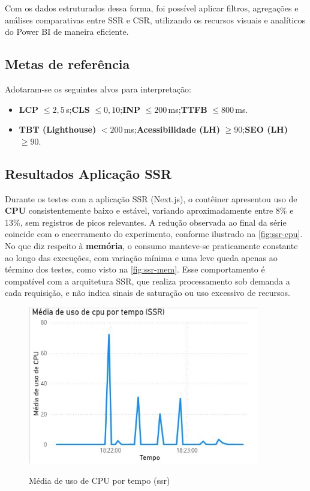 {Com os dados estruturados dessa forma, foi possível aplicar filtros, agregações e análises comparativas entre SSR e CSR, utilizando os recursos visuais e analíticos do Power BI de maneira eficiente.

\subsection{Metas de referência}
Adotaram-se os seguintes alvos para interpretação:
\begin{itemize}
    \item \textbf{LCP} $\leq 2{,}5$\,s;\quad \textbf{CLS} $\leq 0{,}10$;\quad \textbf{INP} $\leq 200$\,ms;\quad \textbf{TTFB} $\leq 800$\,ms.
    \item \textbf{TBT (Lighthouse)} $<200$\,ms;\quad \textbf{Acessibilidade (LH)} $\geq 90$;\quad \textbf{SEO (LH)} $\geq 90$.
\end{itemize}

\subsection{Resultados Aplicação SSR}
\label{subsec:resultados-ssr}

Durante os testes com a aplicação SSR (Next.js), o contêiner apresentou uso de \textbf{CPU} consistentemente baixo e estável, variando aproximadamente entre 8\% e 13\%, sem registros de picos relevantes. A redução observada ao final da série coincide com o encerramento do experimento, conforme ilustrado na \autoref{fig:ssr-cpu}. No que diz respeito à \textbf{memória}, o consumo manteve-se praticamente constante ao longo das execuções, com variação mínima e uma leve queda apenas ao término dos testes, como visto na \autoref{fig:ssr-mem}. Esse comportamento é compatível com a arquitetura SSR, que realiza processamento sob demanda a cada requisição, e não indica sinais de saturação ou uso excessivo de recursos.

\begin{figure}[H]
    \centering
    \caption{Média de uso de CPU por tempo (\acrshort{ssr})}
    \includegraphics[width=0.9\textwidth]{media/uso_cpu_ssr.jpeg}
    \label{fig:ssr-cpu}
\end{figure}

}
